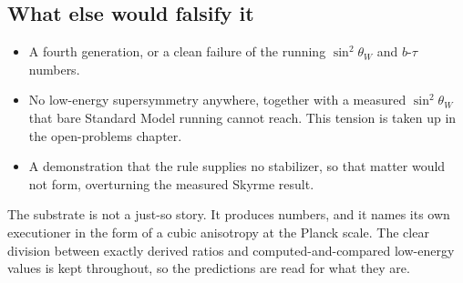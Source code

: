 \subsection{What else would falsify it}

\begin{itemize}
  \item A fourth generation, or a clean failure of the running $\sin^2\theta_W$ and $b$-$\tau$ numbers.
  \item No low-energy supersymmetry anywhere, together with a measured $\sin^2\theta_W$ that bare Standard Model running cannot reach. This tension is taken up in the open-problems chapter.
  \item A demonstration that the rule supplies no stabilizer, so that matter would not form, overturning the measured Skyrme result.
\end{itemize}


The substrate is not a just-so story. It produces numbers, and it names its own executioner in the form of a cubic anisotropy at the Planck scale. The clear division between exactly derived ratios and computed-and-compared low-energy values is kept throughout, so the predictions are read for what they are.
